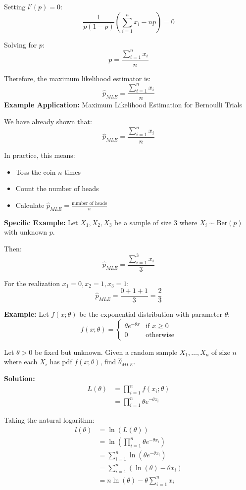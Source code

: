 \documentclass{article}
\begin{document}
   Setting $l'(p) = 0$:
   \[\frac{1}{p(1-p)} \left(\sum_{i=1}^{n} x_i - np\right) = 0\]
   
   Solving for $p$:
   \[p = \frac{\sum_{i=1}^{n} x_i}{n}\]
   
   Therefore, the maximum likelihood estimator is:
   \[\hat{p}_{MLE} = \frac{\sum_{i=1}^{n} x_i}{n}\]
   \textbf{Example Application:} Maximum Likelihood Estimation for Bernoulli Trials
   
   We have already shown that:
   \[\hat{p}_{MLE} = \frac{\sum_{i=1}^{n} x_i}{n}\]
   
   In practice, this means:
   \begin{itemize}
       \item Toss the coin $n$ times
       \item Count the number of heads
       \item Calculate $\hat{p}_{MLE} = \frac{\text{number of heads}}{n}$
   \end{itemize}
   
   \textbf{Specific Example:}
   Let $X_1, X_2, X_3$ be a sample of size 3 where $X_i \sim \text{Ber}(p)$ with unknown $p$.
   
   Then:
   \[\hat{p}_{MLE} = \frac{\sum_{i=1}^{3}x_i}{3}\]
   
   For the realization $x_1 = 0, x_2 = 1, x_3 = 1$:
   \[\hat{p}_{MLE} = \frac{0 + 1 + 1}{3} = \frac{2}{3}\]

   \textbf{Example:} Let $f(x; \theta)$ be the exponential distribution with parameter $\theta$:
   \[f(x; \theta) = 
   \begin{cases}
       \theta e^{-\theta x} & \text{if } x \geq 0 \\
       0 & \text{otherwise}
   \end{cases}\]

   Let $\theta > 0$ be fixed but unknown. Given a random sample $X_1, \ldots, X_n$ of size $n$ where each $X_i$ has pdf $f(x; \theta)$, find $\hat{\theta}_{MLE}$.

   \textbf{Solution:}
   \begin{align*}
       L(\theta) &= \prod_{i=1}^{n} f(x_i; \theta) \\
       &= \prod_{i=1}^{n} \theta e^{-\theta x_i}
   \end{align*}

   Taking the natural logarithm:
   \begin{align*}
       l(\theta) &= \ln(L(\theta)) \\
       &= \ln\left(\prod_{i=1}^{n} \theta e^{-\theta x_i}\right) \\
       &= \sum_{i=1}^{n} \ln(\theta e^{-\theta x_i}) \\
       &= \sum_{i=1}^{n} (\ln(\theta) - \theta x_i) \\
       &= n\ln(\theta) - \theta\sum_{i=1}^{n} x_i
   \end{align*}
\end{document}
